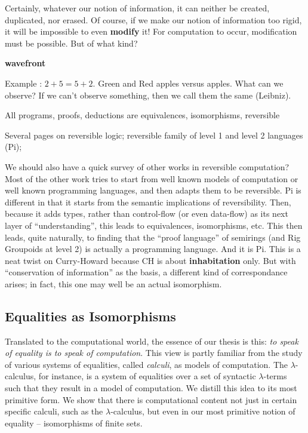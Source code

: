 \documentclass{article}
\newcommand{\jc}[1]{\fbox{Jacques says:} \textbf{#1}}
\newcommand{\lcal}{\ensuremath{\lambda}-calculus}
\begin{document}
Certainly, whatever our notion of information, it can neither be created,
duplicated, nor erased. Of course, if we make our notion of information
too rigid, it will be impossible to even \textbf{modify} it! For computation
to occur, modification must be possible.  But of what kind?

\jc{wavefront}

Example : $2+5 = 5+2$. Green and Red apples versus apples. What
can we observe? If we can't observe something, then we call them
the same (Leibniz).

All programs, proofs, deductions are equivalences, isomorphisms,
reversible

Several pages on reversible logic; reversible family of level 1 and
level 2 languages (Pi);

We should also have a quick survey of other works in reversible
computation? Most of the other work tries to start from well known
models of computation or well known programming languages, and then
adapts them to be reversible. Pi is different in that it starts from
the semantic implications of reversibility. Then, because it adds
types, rather than control-flow (or even data-flow) as its next layer
of ``understanding'', this leads to equivalences, isomorphisms, etc.
This then leads, quite naturally, to finding that the ``proof
language'' of semirings (and Rig Groupoids at level 2) is actually a
programming language. And it is Pi. This is a neat twist on
Curry-Howard because CH is about \textbf{inhabitation} only. But with
``conservation of information'' as the basis, a different kind of
correspondance arises; in fact, this one may well be an actual
isomorphism.

\subsection{Equalities as Isomorphisms}

Translated to the computational world, the essence of our thesis is this:
\emph{to speak of equality is to speak of computation}. This view is partly
familiar from the study of various systems of equalities, called
\emph{calculi}, as models of computation. The \lcal, for instance, is a
system of equalities over a set of syntactic $\lambda$-terms such that they
result in a model of computation. We distill this idea to its most primitive
form. We show that there is computational content not just in certain
specific calculi, such as the \lcal, but even in our most primitive notion of
equality -- isomorphisms of finite sets.
\end{document}
